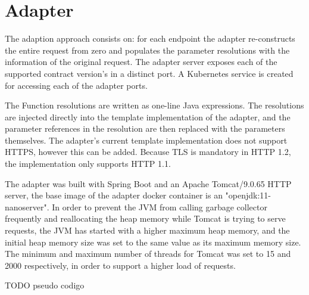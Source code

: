 \section{Adapter} %
\label{sec:adapter}

The adaption approach consists on: for each endpoint the
adapter re-constructs the entire request from zero and populates the parameter resolutions with the information of the original request.
The adapter server exposes each of the supported contract version's in a distinct port.
A Kubernetes service is created for accessing each of the adapter ports.

The Function resolutions are written as one-line Java expressions.
The resolutions are injected directly into the template implementation of the adapter, and the parameter references in the resolution are then replaced with the parameters themselves.
The adapter's current template implementation does not support HTTPS, however this can be added.
Because TLS is mandatory in HTTP 1.2, the implementation only supports HTTP 1.1.

The adapter was built with Spring Boot and an Apache Tomcat/9.0.65 HTTP server, the base image of the adapter docker container is an "openjdk:11-nanoserver".
In order to prevent the JVM from calling garbage collector frequently and reallocating the heap memory while Tomcat is trying to serve requests,
the JVM has started with a higher maximum heap memory, and the initial heap memory
size was set to the same value as its maximum memory size.
The minimum and maximum number of threads for Tomcat was set to 15 and 2000 respectively, in order to support a higher load of requests.

TODO pseudo codigo

